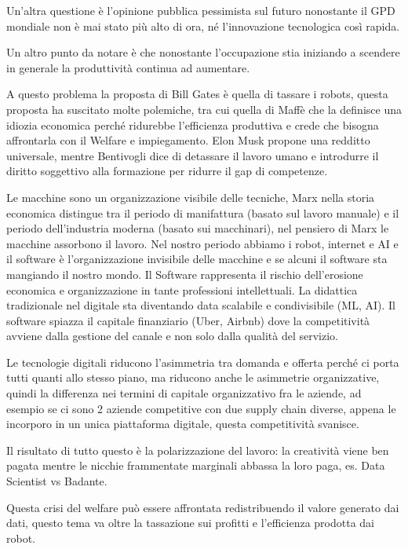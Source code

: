 \documentclass[a4page, 11pt]{article}
\begin{document}
Un'altra questione è l'opinione pubblica pessimista sul futuro
nonostante il GPD mondiale non è mai stato più alto di ora, né
l'innovazione tecnologica così rapida.

Un altro punto da notare è che nonostante l'occupazione stia iniziando a
scendere in generale la produttività continua ad aumentare.

A questo problema la proposta di Bill Gates è quella di tassare i
robots, questa proposta ha suscitato molte polemiche, tra cui quella di
Maffè che la definisce una idiozia economica perché ridurebbe
l'efficienza produttiva e crede che bisogna affrontarla con il Welfare e
impiegamento. Elon Musk propone una redditto universale, mentre
Bentivogli dice di detassare il lavoro umano e introdurre il diritto
soggettivo alla formazione per ridurre il gap di competenze.

Le macchine sono un organizzazione visibile delle tecniche, Marx nella
storia economica distingue tra il periodo di manifattura (basato sul
lavoro manuale) e il periodo dell'industria moderna (basato sui
macchinari), nel pensiero di Marx le macchine assorbono il lavoro. Nel
nostro periodo abbiamo i robot, internet e AI e il software è
l'organizzazione invisibile delle macchine e se alcuni il software sta
mangiando il nostro mondo. Il Software rappresenta il rischio
dell'erosione economica e organizzazione in tante professioni
intellettuali. La didattica tradizionale nel digitale sta diventando
data scalabile e condivisibile (ML, AI). Il software spiazza il capitale
finanziario (Uber, Airbnb) dove la competitività avviene dalla gestione
del canale e non solo dalla qualità del servizio.

Le tecnologie digitali riducono l'asimmetria tra domanda e offerta
perché ci porta tutti quanti allo stesso piano, ma riducono anche le
asimmetrie organizzative, quindi la differenza nei termini di capitale
organizzativo fra le aziende, ad esempio se ci sono 2 aziende
competitive con due supply chain diverse, appena le incorporo in un
unica piattaforma digitale, questa competitività svanisce.

Il risultato di tutto questo è la polarizzazione del lavoro: la
creatività viene ben pagata mentre le nicchie frammentate marginali
abbassa la loro paga, es. Data Scientist vs Badante.

Questa crisi del welfare può essere affrontata redistribuendo il valore
generato dai dati, questo tema va oltre la tassazione sui profitti e
l'efficienza prodotta dai robot.
\end{document}
